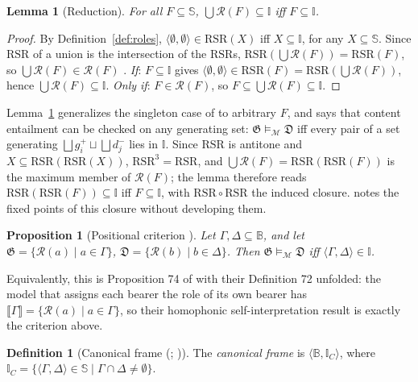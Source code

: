 \documentclass[12pt]{article}
\newcommand{\B}{\mathbb{B}}   %
\newcommand{\I}{\mathbb{I}}
\newtheorem{lemma}{Lemma}
\newtheorem{proposition}{Proposition}
\theoremstyle{definition}
\newtheorem{definition}{Definition}
\newcommand{\tuple}[1]{\langle #1 \rangle}
\newcommand{\Sp}{\mathbb{S}}    %
\newcommand{\sem}[1]{\llbracket #1 \rrbracket}  %
\newcommand{\RSR}{\mathrm{RSR}}   %
\newcommand{\role}{\mathcal{R}}   %
\newcommand{\Mcal}{\mathcal{M}}   %
\begin{document}
\begin{lemma}[Reduction]
\label{lem:reduction}
For all $F \subseteq \Sp$, $\bigcup\role(F) \subseteq \I$ iff $F \subseteq \I$.
\end{lemma}

\begin{proof}
By Definition~\ref{def:roles}, $\tuple{\emptyset,\emptyset} \in \RSR(X)$ iff $X \subseteq \I$, for any $X \subseteq \Sp$. Since $\RSR$ of a union is the intersection of the $\RSR$s, $\RSR(\bigcup \role(F)) = \RSR(F)$, so $\bigcup \role(F) \in \role(F)$ \citep[cf.][Sec.~3.1]{hlobil2026firstorder}. \textit{If}: $F \subseteq \I$ gives $\tuple{\emptyset, \emptyset} \in \RSR(F) = \RSR(\bigcup \role(F))$, hence $\bigcup \role(F) \subseteq \I$. \textit{Only if}: $F \in \role(F)$, so $F \subseteq \bigcup \role(F) \subseteq \I$.
\end{proof}

Lemma~\ref{lem:reduction} generalizes the singleton case of \citet[Prop.~74]{hlobil2025reasons} to arbitrary $F$, and says that content entailment can be checked on any generating set: $\mathfrak{G} \models_{\Mcal} \mathfrak{D}$ iff every pair of a set generating $\bigsqcup g_i^{+} \sqcup \bigsqcup d_j^{-}$ lies in $\I$. Since $\RSR$ is antitone and $X \subseteq \RSR(\RSR(X))$, $\RSR^3 = \RSR$, and $\bigcup \role(F) = \RSR(\RSR(F))$ is the maximum member of $\role(F)$; the lemma therefore reads $\RSR(\RSR(F)) \subseteq \I$ iff $F \subseteq \I$, with $\RSR \circ \RSR$ the induced closure. \citet[Prop.~102]{hlobil2025reasons} notes the fixed points of this closure without developing them.

\begin{proposition}[Positional criterion {\citep[Prop.~12]{hlobil2026firstorder}}] \label{prop:positional}
Let $\Gamma, \Delta \subseteq \B$, and let $\mathfrak{G} = \{\role(a) \mid a \in \Gamma\}$, $\mathfrak{D} = \{\role(b) \mid b \in \Delta\}$. Then $\mathfrak{G} \models_{\Mcal} \mathfrak{D}$ iff $\tuple{\Gamma, \Delta} \in \I$.
\end{proposition}

Equivalently, this is Proposition 74 of \citet{hlobil2025reasons} with their Definition 72 unfolded: the model that assigns each bearer the role of its own bearer has $\sem{\Gamma} = \{\role(a) \mid a \in \Gamma\}$, so their homophonic self-interpretation result is exactly the criterion above.

\begin{definition}[Canonical frame {(\citealp[Def.~34]{hlobil2026firstorder}; \citealp[assumption~(iii)]{hlobil2026objects}})]
\label{def:canonicalframe}
The \textit{canonical frame} is $\tuple{\B, \I_{C}}$, where $\I_{C} = \{\tuple{\Gamma, \Delta} \in \Sp \mid \Gamma \cap \Delta \neq \emptyset\}$.
\end{definition}
\end{document}

